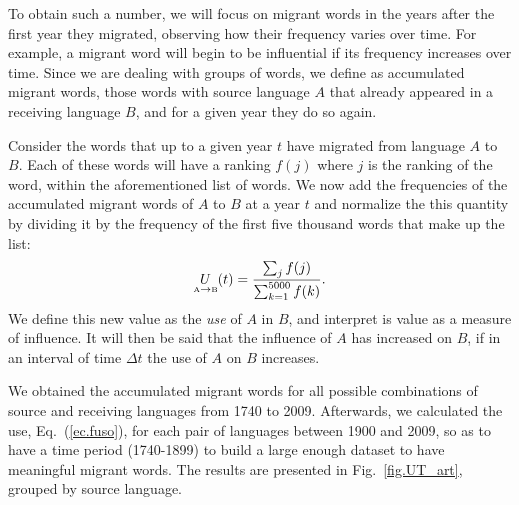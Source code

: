 \documentclass[10pt,letterpaper]{article} %
\newcommand{\eref}[1]{Eq.~(\ref{#1})}
\newcommand{\fref}[1]{Fig.~\ref{#1}}
\begin{document}
To obtain such a number, we will focus on migrant words in the years after the
first year they migrated, observing how their frequency varies over time. For
example, a migrant word will begin to be influential if its frequency increases
over time. Since we are dealing with groups of words, we define as accumulated
migrant words, those words with source language $A$ that already appeared in a
receiving language $B$, and for a given year they do so again.


Consider the words that up to a given year $t$ have migrated from language $A$ to $B$. Each of these
words will have a ranking $f(j)$ where $j$ is the ranking of the word, within the aforementioned
list of words. 
% 
We now
add the frequencies of the accumulated
migrant words of $A$ to $B$ at a year $t$ and normalize the this quantity by
dividing it by the frequency of the first five thousand words that make up the list:
\begin{equation}
\label{ec.fuso}
\underset{ \text{\tiny A} \to  \text{\tiny B} }{U}(t) = \frac{\sum_{j}
f(j)}{\sum_{k=1}^{5000} f(k)}.
\end{equation}
We define this new value as the \textit{use} of $A$ in $B$, and interpret is value
as a measure of influence. It will then be said that the influence of $A$ has increased on
$B$, if in an interval of time $\Delta t$ the use of $A$ on $B$ increases.

We obtained the accumulated migrant words for all possible combinations of
source and receiving languages from 1740 to 2009.  Afterwards, we calculated
the use, \eref{ec.fuso},  for each pair of languages between 1900 and 2009, so
as to have a time period (1740-1899) to build a large enough dataset to have
meaningful migrant words. The results are presented in \fref{fig.UT_art}, 
grouped by source language. 


% 
\end{document}
